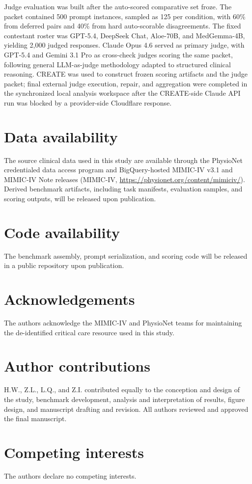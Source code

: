 \documentclass[pdflatex,sn-nature]{sn-jnl}
\begin{document}
Judge evaluation was built after the auto-scored comparative set froze. The packet contained 500 prompt instances, sampled as 125 per condition, with 60\% from deferred pairs and 40\% from hard auto-scorable disagreements. The fixed contestant roster was GPT-5.4, DeepSeek Chat, Aloe-70B, and MedGemma-4B, yielding 2,000 judged responses. Claude Opus 4.6 served as primary judge, with GPT-5.4 and Gemini 3.1 Pro as cross-check judges scoring the same packet, following general LLM-as-judge methodology adapted to structured clinical reasoning\cite{zheng2023judging}. CREATE was used to construct frozen scoring artifacts and the judge packet; final external judge execution, repair, and aggregation were completed in the synchronized local analysis workspace after the CREATE-side Claude API run was blocked by a provider-side Cloudflare response.

\section*{Data availability}

The source clinical data used in this study are available through the PhysioNet credentialed data access program and BigQuery-hosted MIMIC-IV v3.1 and MIMIC-IV Note releases (MIMIC-IV, \url{https://physionet.org/content/mimiciv/}). Derived benchmark artifacts, including task manifests, evaluation samples, and scoring outputs, will be released upon publication.

\section*{Code availability}

The benchmark assembly, prompt serialization, and scoring code will be released in a public repository upon publication.

\section*{Acknowledgements}

The authors acknowledge the MIMIC-IV and PhysioNet teams for maintaining the de-identified critical care resource used in this study.

\section*{Author contributions}

H.W., Z.L., L.Q., and Z.I. contributed equally to the conception and design of the study, benchmark development, analysis and interpretation of results, figure design, and manuscript drafting and revision. All authors reviewed and approved the final manuscript.

\section*{Competing interests}

The authors declare no competing interests.


\end{document}
